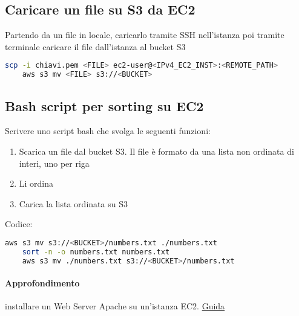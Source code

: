 \subsection{Caricare un file su S3 da EC2}
Partendo da un file in locale, caricarlo tramite SSH nell'istanza poi tramite terminale caricare il file dall'istanza al bucket S3
\begin{lstlisting}[language=bash]
    scp -i chiavi.pem <FILE> ec2-user@<IPv4_EC2_INST>:<REMOTE_PATH>
    aws s3 mv <FILE> s3://<BUCKET>
\end{lstlisting}

\subsection{Bash script per sorting su EC2}
Scrivere uno script bash che svolga le seguenti funzioni:
\begin{enumerate}
    \item Scarica un file dal bucket S3. Il file è formato da una lista non ordinata di interi, uno per riga
    \item Li ordina
    \item Carica la lista ordinata su S3
\end{enumerate}
Codice:
\begin{lstlisting}[language=bash]
    aws s3 mv s3://<BUCKET>/numbers.txt ./numbers.txt
    sort -n -o numbers.txt numbers.txt
    aws s3 mv ./numbers.txt s3://<BUCKET>/numbers.txt    
\end{lstlisting}

\paragraph{Approfondimento} installare un Web Server Apache su un'istanza EC2. \href{https://cloudkatha.com/how-to-install-apache-web-server- on-amazon-linux-2/}{Guida}